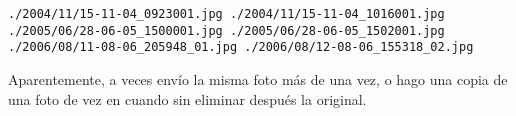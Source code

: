 \begin{ex}
\begin{enumerate}
\beforeverb
\begin{verbatim}
./2004/11/15-11-04_0923001.jpg ./2004/11/15-11-04_1016001.jpg
./2005/06/28-06-05_1500001.jpg ./2005/06/28-06-05_1502001.jpg
./2006/08/11-08-06_205948_01.jpg ./2006/08/12-08-06_155318_02.jpg
\end{verbatim}
\afterverb
%
Aparentemente, a veces envío la misma foto más de una vez,
o hago una copia de una foto de vez en cuando sin eliminar después
la original.

\end{enumerate}

\end{ex}